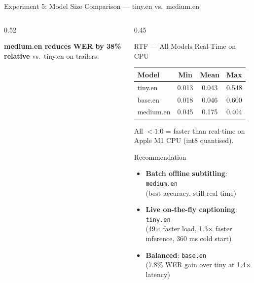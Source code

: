 \documentclass[aspectratio=169]{beamer}
\begin{document}
\begin{frame}{Experiment 5: Model Size Comparison — tiny.en vs.\ medium.en}
\begin{columns}[T]
\begin{column}{0.52\textwidth}
      \vspace{0.2cm}
      \begin{center}
        \textbf{medium.en reduces WER by 38\% relative} vs.\ tiny.en on trailers.
      \end{center}
    \end{column}
    \begin{column}{0.45\textwidth}
      \begin{block}{RTF — All Models Real-Time on CPU}
        \begin{center}
          \small
          \begin{tabular}{@{}lccc@{}}
            \toprule
            Model & Min & Mean & Max \\
            \midrule
            tiny.en & 0.013 & 0.043 & 0.548 \\
            base.en & 0.018 & 0.046 & 0.600 \\
            medium.en & 0.045 & 0.175 & 0.404 \\
            \bottomrule
          \end{tabular}
        \end{center}
        All $< 1.0$ = faster than real-time on Apple M1 CPU (int8 quantised).
      \end{block}
      \begin{block}{Recommendation}
        \begin{itemize}
          \item \textbf{Batch offline subtitling}: \texttt{medium.en}\\
            (best accuracy, still real-time)
          \item \textbf{Live on-the-fly captioning}: \texttt{tiny.en}\\
            (49$\times$ faster load, 1.3$\times$ faster inference, 360 ms cold start)
          \item \textbf{Balanced}: \texttt{base.en}\\
            (7.8\% WER gain over tiny at 1.4$\times$ latency)
        \end{itemize}
      \end{block}
    \end{column}
  \end{columns}
\end{frame}
\end{document}
